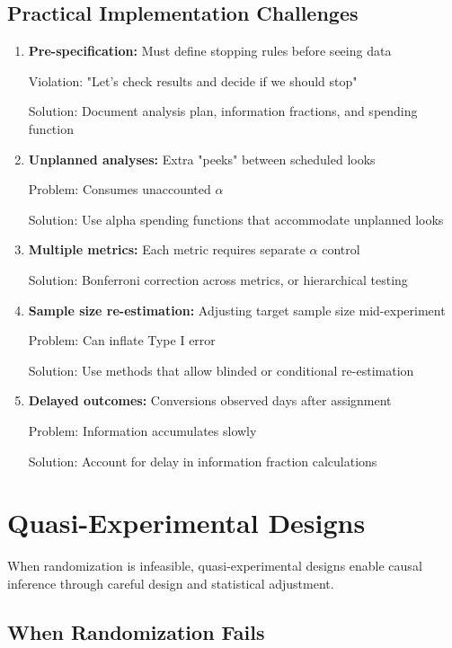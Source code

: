 \subsection{Practical Implementation Challenges}

\begin{enumerate}
    \item \textbf{Pre-specification:} Must define stopping rules before seeing data

    Violation: "Let's check results and decide if we should stop"

    Solution: Document analysis plan, information fractions, and spending function

    \item \textbf{Unplanned analyses:} Extra "peeks" between scheduled looks

    Problem: Consumes unaccounted $\alpha$

    Solution: Use alpha spending functions that accommodate unplanned looks

    \item \textbf{Multiple metrics:} Each metric requires separate $\alpha$ control

    Solution: Bonferroni correction across metrics, or hierarchical testing

    \item \textbf{Sample size re-estimation:} Adjusting target sample size mid-experiment

    Problem: Can inflate Type I error

    Solution: Use methods that allow blinded or conditional re-estimation

    \item \textbf{Delayed outcomes:} Conversions observed days after assignment

    Problem: Information accumulates slowly

    Solution: Account for delay in information fraction calculations
\end{enumerate}

\section{Quasi-Experimental Designs}

When randomization is infeasible, quasi-experimental designs enable causal inference through careful design and statistical adjustment.

\subsection{When Randomization Fails}

